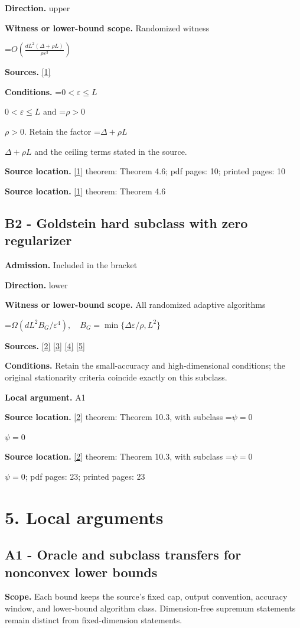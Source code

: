 \documentclass[10pt,a4paper]{article}
\newcommand{\AtlasMath}[1]{\par\begingroup\centering\setbox0=\hbox{$\displaystyle #1$}\ifdim\wd0>1.4\linewidth\typeout{ATLAS WIDE FORMULA: \the\wd0}\fi\ifdim\wd0>\linewidth\resizebox{\linewidth}{!}{\box0}\else\box0\fi\par\endgroup}
\newcommand{\AtlasInlineMath}[1]{\begingroup\setbox0=\hbox{$#1$}\ifdim\wd0>.4\linewidth\endgroup\AtlasMath{#1}\else\endgroup$#1$\fi}
\begin{document}
\textbf{Direction.} upper

\textbf{Witness or lower-bound scope.} Randomized witness

\AtlasMath{O\!\left(\frac{dL^2(\Delta+\rho L)}{\rho\varepsilon^3}\right)}
\textbf{Sources.} \href{https://arxiv.org/abs/2610.12328v1}{[1]}

\textbf{Conditions.} \AtlasInlineMath{0<\varepsilon\le L} and \AtlasInlineMath{\rho>0}. Retain the factor \AtlasInlineMath{\Delta+\rho L} and the ceiling terms stated in the source.

\textbf{Source location.} \href{https://arxiv.org/abs/2610.12328v1}{[1]} theorem: Theorem 4.6; pdf pages: 10; printed pages: 10

\textbf{Source location.} \href{https://arxiv.org/abs/2610.12328v1}{[1]} theorem: Theorem 4.6

\subsection{B2 - Goldstein hard subclass with zero regularizer}
\textbf{Admission.} Included in the bracket

\textbf{Direction.} lower

\textbf{Witness or lower-bound scope.} All randomized adaptive algorithms

\AtlasMath{\Omega(dL^2B_G/\varepsilon^4),\quad B_G=\min\{\Delta\varepsilon/\rho,L^2\}}
\textbf{Sources.} \href{https://arxiv.org/html/2610.19652v1}{[2]} \href{https://arxiv.org/html/2609.00045v3}{[3]} \href{https://arxiv.org/pdf/2610.00245v2}{[4]} \href{https://arxiv.org/html/2610.17074v1}{[5]}

\textbf{Conditions.} Retain the small-accuracy and high-dimensional conditions; the original stationarity criteria coincide exactly on this subclass.

\textbf{Local argument.} A1

\textbf{Source location.} \href{https://arxiv.org/html/2610.19652v1}{[2]} theorem: Theorem 10.3, with subclass \AtlasInlineMath{\psi=0}

\textbf{Source location.} \href{https://arxiv.org/html/2610.19652v1}{[2]} theorem: Theorem 10.3, with subclass \AtlasInlineMath{\psi=0}; pdf pages: 23; printed pages: 23

\section{5. Local arguments}
\subsection{A1 - Oracle and subclass transfers for nonconvex lower bounds}
\textbf{Scope.} Each bound keeps the source's fixed cap, output convention, accuracy window, and lower-bound algorithm class. Dimension-free supremum statements remain distinct from fixed-dimension statements.
\end{document}
